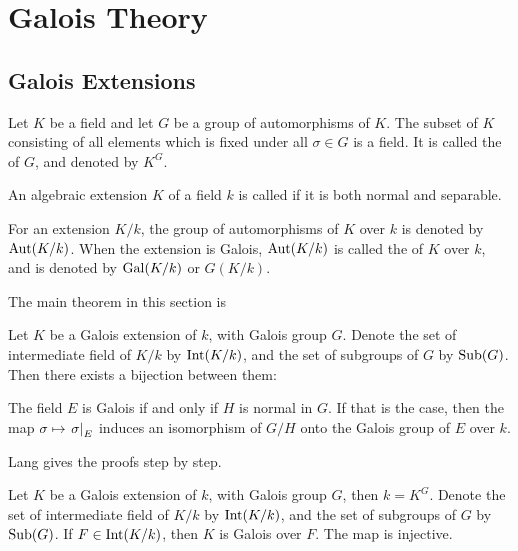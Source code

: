 \chapter{Galois Theory}
\cite{morandi1996field}
\section{Galois Extensions}
  \begin{defn}
    Let $K$ be a field and let $G$ be a group of automorphisms of $K$. The subset of $K$ consisting of all elements which is fixed under all $\sigma\in G$ is a field. It is called the  of $G$, and denoted by $K^G$.
  \end{defn}

  \begin{defn}
    An algebraic extension $K$ of a field $k$ is called  if it is both normal and separable.
  \end{defn}

  \begin{defn}
    For an extension $K/k$, the group of automorphisms of $K$ over $k$ is denoted by $\operatorname{Aut}(K/k)$. When the extension is Galois, $\operatorname{Aut}(K/k)$ is called the  of $K$ over $k$, and is denoted by $\operatorname{Gal}(K/k)$ or $G(K/k)$.
  \end{defn}

  The main theorem in this section is
  \begin{thm}
    Let $K$ be a Galois extension of $k$, with Galois group $G$. Denote the set of intermediate field of $K/k$ by $\operatorname{Int}(K/k)$, and the set of subgroups of $G$ by $\operatorname{Sub}(G)$. Then there exists a bijection between them:

    The field $E$ is Galois if and only if $H$ is normal in $G$. If that is the case, then the map $\sigma\mapsto\left.{\sigma}\right|_{E}$ induces an isomorphism of $G/H$ onto the Galois group of $E$ over $k$.
  \end{thm}

  Lang gives the proofs step by step.

  \begin{thm}
    Let $K$ be a Galois extension of $k$, with Galois group $G$, then $k=K^G$. Denote the set of intermediate field of $K/k$ by $\operatorname{Int}(K/k)$, and the set of subgroups of $G$ by $\operatorname{Sub}(G)$. If $F\in\operatorname{Int}(K/k)$, then $K$ is Galois over $F$. The map
    is injective.
  \end{thm}

